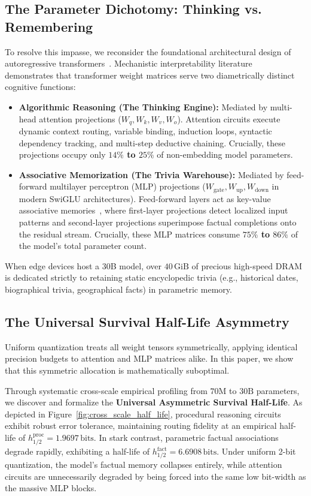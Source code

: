 \documentclass[10pt,twocolumn,letterpaper]{article}
\begin{document}
\subsection{The Parameter Dichotomy: Thinking vs. Remembering}
\label{sec:intro_dichotomy}
To resolve this impasse, we reconsider the foundational architectural design of autoregressive transformers~\cite{vaswani2017attention}. Mechanistic interpretability literature~\cite{geva2021transformer,meng2022locating,olsson2022incontext,elhage2022superposition} demonstrates that transformer weight matrices serve two diametrically distinct cognitive functions:
\begin{itemize}[leftmargin=*]
    \item \textbf{Algorithmic Reasoning (The Thinking Engine):} Mediated by multi-head attention projections ($W_q, W_k, W_v, W_o$). Attention circuits execute dynamic context routing, variable binding, induction loops, syntactic dependency tracking, and multi-step deductive chaining. Crucially, these projections occupy only \textbf{$14\%$ to $25\%$} of non-embedding model parameters.
    \item \textbf{Associative Memorization (The Trivia Warehouse):} Mediated by feed-forward multilayer perceptron (MLP) projections ($W_{\text{gate}}, W_{\text{up}}, W_{\text{down}}$ in modern SwiGLU architectures). Feed-forward layers act as key-value associative memories~\cite{geva2021transformer}, where first-layer projections detect localized input patterns and second-layer projections superimpose factual completions onto the residual stream. Crucially, these MLP matrices consume \textbf{$75\%$ to $86\%$} of the model's total parameter count.
\end{itemize}

When edge devices host a 30B model, over $40\,\text{GiB}$ of precious high-speed DRAM is dedicated strictly to retaining static encyclopedic trivia (e.g., historical dates, biographical trivia, geographical facts) in parametric memory.

\subsection{The Universal Survival Half-Life Asymmetry}
\label{sec:intro_halflife}
Uniform quantization treats all weight tensors symmetrically, applying identical precision budgets to attention and MLP matrices alike. In this paper, we show that this symmetric allocation is mathematically suboptimal. 

Through systematic cross-scale empirical profiling from $70\text{M}$ to $30\text{B}$ parameters, we discover and formalize the \textbf{Universal Asymmetric Survival Half-Life}. As depicted in Figure~\ref{fig:cross_scale_half_life}, procedural reasoning circuits exhibit robust error tolerance, maintaining routing fidelity at an empirical half-life of $h_{1/2}^{\text{proc}} = 1.9697\,\text{bits}$. In stark contrast, parametric factual associations degrade rapidly, exhibiting a half-life of $h_{1/2}^{\text{fact}} = 6.6908\,\text{bits}$. Under uniform 2-bit quantization, the model's factual memory collapses entirely, while attention circuits are unnecessarily degraded by being forced into the same low bit-width as the massive MLP blocks.
\end{document}
